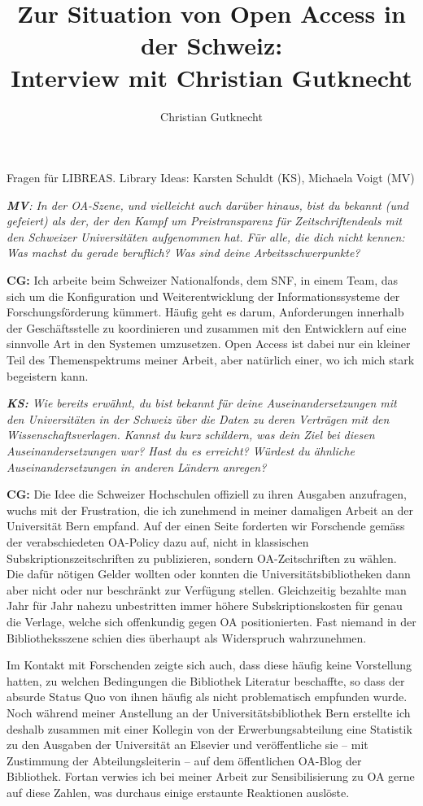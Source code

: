 \documentclass[a4paper,
fontsize=11pt,
oneside,
numbers=noperiodatend,
parskip=half-,
bibliography=totoc,
final
]{scrartcl}
\title{\LARGE{Zur Situation von Open Access in der Schweiz:\\ Interview mit Christian Gutknecht}} %
\author{Christian Gutknecht} %
\date{}
\begin{document}
\maketitle
\thispagestyle{fancyplain} 


Fragen für LIBREAS. Library Ideas: Karsten Schuldt (KS), Michaela Voigt
(MV)

\emph{\textbf{MV}: In der OA-Szene, und vielleicht auch darüber hinaus,
bist du bekannt (und gefeiert) als der, der den Kampf um
Preistransparenz für Zeitschriftendeals mit den Schweizer Universitäten
aufgenommen hat. Für alle, die dich nicht kennen: Was machst du gerade
beruflich? Was sind deine Arbeitsschwerpunkte?}

\textbf{CG:} Ich arbeite beim Schweizer Nationalfonds, dem SNF, in einem
Team, das sich um die Konfiguration und Weiterentwicklung der
Informationssysteme der Forschungsförderung kümmert. Häufig geht es
darum, Anforderungen innerhalb der Geschäftsstelle zu koordinieren und
zusammen mit den Entwicklern auf eine sinnvolle Art in den Systemen
umzusetzen. Open Access ist dabei nur ein kleiner Teil des
Themenspektrums meiner Arbeit, aber natürlich einer, wo ich mich stark
begeistern kann.

\emph{\textbf{KS:} Wie bereits erwähnt, du bist bekannt für deine
Auseinandersetzungen mit den Universitäten in der Schweiz über die Daten
zu deren Verträgen mit den Wissenschaftsverlagen. Kannst du kurz
schildern, was dein Ziel bei diesen Auseinandersetzungen war? Hast du es
erreicht? Würdest du ähnliche Auseinandersetzungen in anderen Ländern
anregen?}

\textbf{CG:} Die Idee die Schweizer Hochschulen offiziell zu ihren
Ausgaben anzufragen, wuchs mit der Frustration, die ich zunehmend in
meiner damaligen Arbeit an der Universität Bern empfand. Auf der einen
Seite forderten wir Forschende gemäss der verabschiedeten OA-Policy dazu
auf, nicht in klassischen Subskriptionszeitschriften zu publizieren,
sondern OA-Zeitschriften zu wählen. Die dafür nötigen Gelder wollten
oder konnten die Universitätsbibliotheken dann aber nicht oder nur
beschränkt zur Verfügung stellen. Gleichzeitig bezahlte man Jahr für
Jahr nahezu unbestritten immer höhere Subskriptionskosten für genau die
Verlage, welche sich offenkundig gegen OA positionierten. Fast niemand
in der Bibliotheksszene schien dies überhaupt als Widerspruch
wahrzunehmen.

Im Kontakt mit Forschenden zeigte sich auch, dass diese häufig keine
Vorstellung hatten, zu welchen Bedingungen die Bibliothek Literatur
beschaffte, so dass der absurde Status Quo von ihnen häufig als nicht
problematisch empfunden wurde. Noch während meiner Anstellung an der
Universitätsbibliothek Bern erstellte ich deshalb zusammen mit einer
Kollegin von der Erwerbungsabteilung eine Statistik zu den Ausgaben der
Universität an Elsevier und veröffentliche sie -- mit Zustimmung der
Abteilungsleiterin -- auf dem öffentlichen OA-Blog der Bibliothek.
Fortan verwies ich bei meiner Arbeit zur Sensibilisierung zu OA gerne
auf diese Zahlen, was durchaus einige erstaunte Reaktionen auslöste.
\end{document}
